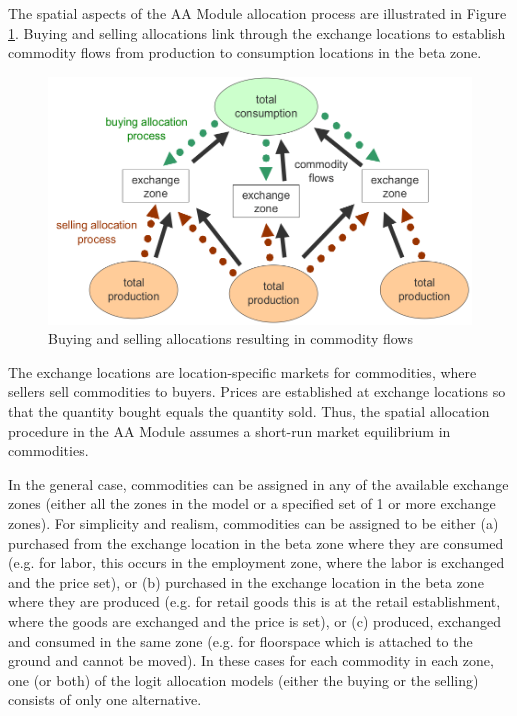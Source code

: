 The spatial aspects of the AA Module allocation process are illustrated in Figure \ref{fig:aa-spatial-aspects}. Buying and selling allocations link through the exchange locations to establish commodity flows from production to consumption locations in the beta zone.

\begin{figure}   %
\centering
\includegraphics[scale=0.35]{aa/spatial-aspects}
\caption{Buying and selling allocations resulting in commodity flows}\label{fig:aa-spatial-aspects}
\end{figure}

The exchange locations are location-specific markets for commodities, where sellers sell commodities to buyers. Prices are established at exchange locations so that the quantity bought equals the quantity sold. Thus, the spatial allocation procedure in the AA Module assumes a short-run market equilibrium in commodities.

In the general case, commodities can be assigned in any of the available exchange zones (either all the zones in the model or a specified set of 1 or more exchange zones). For simplicity and realism, commodities can be assigned to be either (a) purchased from the exchange location in the beta zone where they are consumed (e.g. for labor, this occurs in the employment zone, where the labor is exchanged and the price set), or (b) purchased in the exchange location in the beta zone where they are produced (e.g. for retail goods this is at the retail establishment, where the goods are exchanged and the price is set), or (c) produced, exchanged and consumed in the same zone (e.g. for floorspace which is attached to the ground and cannot be moved). In these cases for each commodity in each zone, one (or both) of the logit allocation models (either the buying or the selling) consists of only one alternative.

